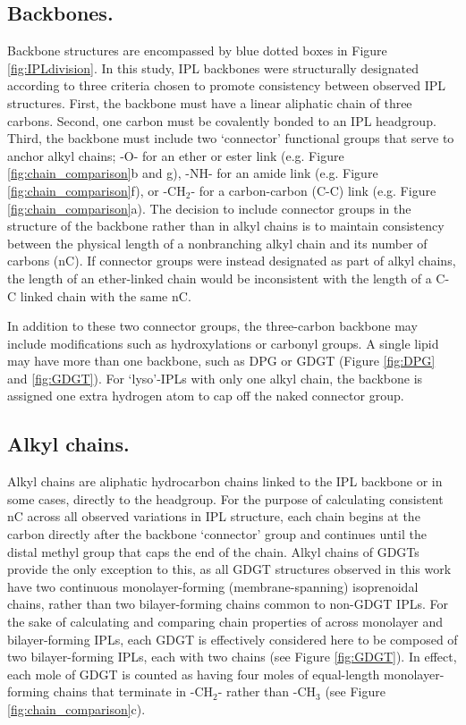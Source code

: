 \subsection{Backbones.} Backbone structures are encompassed by blue dotted boxes in Figure \ref{fig:IPLdivision}. In this study, IPL backbones were structurally designated according to three criteria chosen to promote consistency between observed IPL structures. First, the backbone must have a linear aliphatic chain of three carbons. Second, one carbon must be covalently bonded to an IPL headgroup. Third, the backbone must include two `connector' functional groups that serve to anchor alkyl chains; -O- for an ether or ester link (e.g. Figure \ref{fig:chain_comparison}b and g), -NH- for an amide link (e.g. Figure \ref{fig:chain_comparison}f), or -CH$_{2}$- for a carbon-carbon (C-C) link (e.g. Figure \ref{fig:chain_comparison}a). The decision to include connector groups in the structure of the backbone rather than in alkyl chains is to maintain consistency between the physical length of a nonbranching alkyl chain and its number of carbons (nC). If connector groups were  instead designated as part of alkyl chains, the length of an ether-linked chain would be inconsistent with the length of a C-C linked chain with the same nC.

\par In addition to these two connector groups, the three-carbon backbone may include modifications such as hydroxylations or carbonyl groups. A single lipid may have more than one backbone, such as DPG or GDGT (Figure \ref{fig:DPG} and \ref{fig:GDGT}). For `lyso'-IPLs with only one alkyl chain, the backbone is assigned one extra hydrogen atom to cap off the naked connector group.

\subsection{Alkyl chains.} Alkyl chains are aliphatic hydrocarbon chains linked to the IPL backbone or in some cases, directly to the headgroup. For the purpose of calculating consistent nC across all observed variations in IPL structure, each chain begins at the carbon directly after the backbone `connector' group and continues until the distal methyl group that caps the end of the chain. Alkyl chains of GDGTs provide the only exception to this, as all GDGT structures observed in this work have two continuous monolayer-forming (membrane-spanning) isoprenoidal chains, rather than two bilayer-forming chains common to non-GDGT IPLs. For the sake of calculating and comparing chain properties of across monolayer and bilayer-forming IPLs, each GDGT is effectively considered here to be composed of two bilayer-forming IPLs, each with two chains (see Figure \ref{fig:GDGT}). In effect, each mole of GDGT is counted as having four moles of equal-length monolayer-forming chains that terminate in -CH$_{2}$- rather than -CH$_{3}$ (see Figure \ref{fig:chain_comparison}c).

